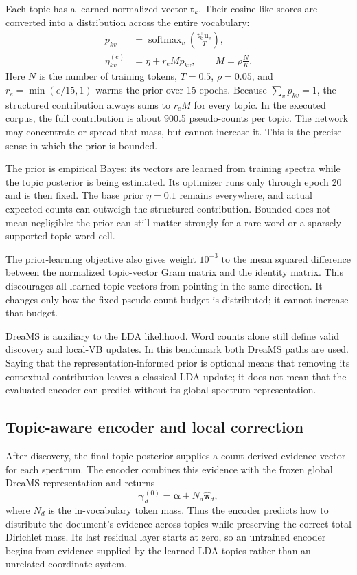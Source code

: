 \documentclass[11pt]{article}
\begin{document}
Each topic has a learned normalized vector $\mathbf t_k$. Their cosine-like
scores are converted into a distribution across the entire vocabulary:
\begin{align}
 p_{kv} &= \operatorname{softmax}_v
 \left(\frac{\mathbf t_k^\top\mathbf u_v}{T}\right),\\
 \eta_{kv}^{(e)} &= \eta+r_e M p_{kv},
 \qquad M=\rho\frac{N}{K}.
 \label{eq:bounded-prior}
\end{align}
Here $N$ is the number of training tokens, $T=0.5$, $\rho=0.05$, and
$r_e=\min(e/15,1)$ warms the prior over 15 epochs. Because
$\sum_v p_{kv}=1$, the structured contribution always sums to $r_eM$ for
every topic. In the executed corpus, the full contribution is about 900.5
pseudo-counts per topic. The network may concentrate or spread that mass, but
cannot increase it. This is the precise sense in which the prior is bounded.

The prior is empirical Bayes: its vectors are learned from training spectra
while the topic posterior is being estimated. Its optimizer runs only through
epoch 20 and is then fixed. The base prior $\eta=0.1$ remains everywhere, and
actual expected counts can outweigh the structured contribution. Bounded does
not mean negligible: the prior can still matter strongly for a rare word or a
sparsely supported topic-word cell.

The prior-learning objective also gives weight $10^{-3}$ to the mean squared
difference between the normalized topic-vector Gram matrix and the identity
matrix. This discourages all learned topic vectors from pointing in the same
direction. It changes only how the fixed pseudo-count budget is distributed;
it cannot increase that budget.

DreaMS is auxiliary to the LDA likelihood. Word counts alone still define
valid discovery and local-VB updates. In this benchmark both DreaMS paths are
used. Saying that the representation-informed prior is optional means that
removing its contextual contribution leaves a classical LDA update; it does
not mean that the evaluated encoder can predict without its global spectrum
representation.

\subsection{Topic-aware encoder and local correction}

After discovery, the final topic posterior supplies a count-derived evidence
vector for each spectrum. The encoder combines this evidence with the frozen
global DreaMS representation and returns
\begin{equation}
  \boldsymbol\gamma_d^{(0)}=
  \boldsymbol\alpha+N_d\widehat{\boldsymbol\pi}_d,
  \label{eq:encoder-start}
\end{equation}
where $N_d$ is the in-vocabulary token mass. Thus the encoder predicts how to
distribute the document's evidence across topics while preserving the correct
total Dirichlet mass. Its last residual layer starts at zero, so an untrained
encoder begins from evidence supplied by the learned LDA topics rather than an
unrelated coordinate system.
\end{document}
